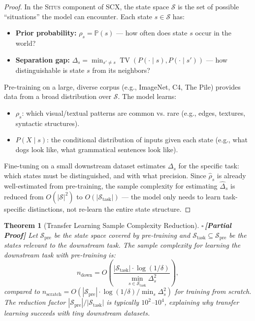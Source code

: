 \documentclass[12pt,a4paper]{article}
\newtheorem{theorem}{Theorem}[section]
\theoremstyle{definition}
\newcommand{\rigorPartial}{{\color{rigorcolor}$\square$\,\textbf{[Partial Proof]}}}
\newcommand{\Situs}{\textsc{Situs}}
\newcommand{\SCX}{\textsc{SCX}}
\DeclareMathOperator{\TV}{TV}
\newcommand{\Pbb}{\mathbb{P}}
\newcommand{\cS}{\mathcal{S}}
\begin{document}
\begin{proof}
In the \Situs{} component of \SCX{}, the state space $\cS$ is the set of possible ``situations'' the model can encounter. Each state $s \in \cS$ has:
\begin{itemize}[nosep]
    \item \textbf{Prior probability:} $\rho_s = \Pbb(s)$ — how often does state $s$ occur in the world?
    \item \textbf{Separation gap:} $\Delta_s = \min_{s' \neq s} \TV(P(\cdot \mid s), P(\cdot \mid s'))$ — how distinguishable is state $s$ from its neighbors?
\end{itemize}

Pre-training on a large, diverse corpus (e.g., ImageNet, C4, The Pile) provides data from a broad distribution over $\cS$. The model learns:
\begin{itemize}[nosep]
    \item $\rho_s$: which visual/textual patterns are common vs. rare (e.g., edges, textures, syntactic structures).
    \item $P(X \mid s)$: the conditional distribution of inputs given each state (e.g., what dogs look like, what grammatical sentences look like).
\end{itemize}

Fine-tuning on a small downstream dataset estimates $\Delta_s$ for the specific task: which states must be distinguished, and with what precision. Since $\hat{\rho}_s$ is already well-estimated from pre-training, the sample complexity for estimating $\hat{\Delta}_s$ is reduced from $O(|\cS|^2)$ to $O(|\cS_{\text{task}}|)$ — the model only needs to learn task-specific distinctions, not re-learn the entire state structure.
\end{proof}

\begin{theorem}[Transfer Learning Sample Complexity Reduction]\label{thm:transfer_sample}
\rigorPartial
Let $\cS_{\text{pre}}$ be the state space covered by pre-training and $\cS_{\text{task}} \subseteq \cS_{\text{pre}}$ be the states relevant to the downstream task. The sample complexity for learning the downstream task with pre-training is:
\begin{equation}\label{eq:transfer_complexity}
    n_{\text{down}} = O\left(\frac{|\cS_{\text{task}}| \cdot \log(1/\delta)}{\min_{s \in \cS_{\text{task}}} \Delta_s^2}\right),
\end{equation}
compared to $n_{\text{scratch}} = O(|\cS_{\text{pre}}| \cdot \log(1/\delta) / \min_s \Delta_s^2)$ for training from scratch. The reduction factor $|\cS_{\text{pre}}| / |\cS_{\text{task}}|$ is typically $10^2$–$10^4$, explaining why transfer learning succeeds with tiny downstream datasets.
\end{theorem}
\end{document}
